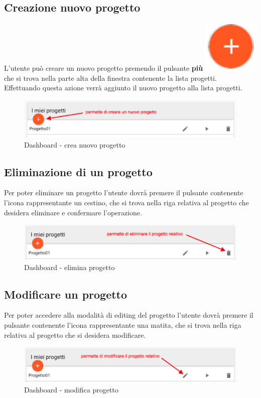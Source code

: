 \subsection{Creazione nuovo progetto}
L'utente può creare un nuovo progetto premendo il pulsante \textbf{più} \includegraphics[scale=0.5]{immagini/piuButton.pdf} che si trova nella parte alta della finestra contenente la lista progetti.\\
Effettuando questa azione verrà aggiunto il nuovo progetto alla lista progetti.
\begin{figure}[H]
\centering
\includegraphics[scale=0.5]{immagini/imgCreaProg.pdf}
\caption{Dashboard - crea nuovo progetto}
\end{figure}
\subsection{Eliminazione di un progetto}
Per poter eliminare un progetto l'utente dovrà premere il pulsante contenente l'icona rappresentante un cestino, che si trova nella riga relativa al progetto che desidera eliminare e confermare l'operazione.
\begin{figure}[H]
\centering
\includegraphics[scale=0.5]{immagini/imgEliminaProg.pdf}
\caption{Dashboard - elimina progetto}
\end{figure}
\subsection{Modificare un progetto}
Per poter accedere alla modalità di editing del progetto l'utente dovrà premere il pulsante contenente l'icona rappresentante una matita, che si trova nella riga relativa al progetto che si desidera modificare.
\begin{figure}[H]
\centering
\includegraphics[scale=0.5]{immagini/imgModificaProg.pdf}
\caption{Dashboard - modifica progetto}
\end{figure}
